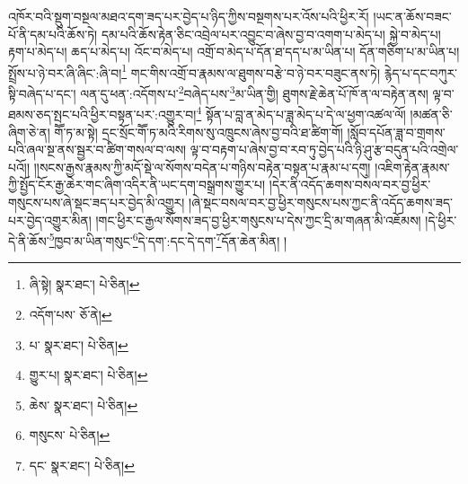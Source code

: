 འཁོར་བའི་སྡུག་བསྔལ་མཐའ་དག་ཟད་པར་བྱེད་པ་ཉིད་ཀྱིས་བསྔགས་པར་འོས་པའི་ཕྱིར་རོ། །ཡང་ན་ཆོས་བཟང་པོ་ནི་དམ་པའི་ཆོས་ཏེ། དམ་པའི་ཆོས་རྟེན་ཅིང་འབྲེལ་པར་འབྱུང་བ་ཞེས་བྱ་བ་འགག་པ་མེད་པ། སྐྱེ་བ་མེད་པ། རྟག་པ་མེད་པ། ཆད་པ་མེད་པ། འོང་བ་མེད་པ། འགྲོ་བ་མེད་པ་དོན་ཐ་དད་པ་མ་ཡིན་པ། དོན་གཅིག་པ་མ་ཡིན་པ། སྤྲོས་པ་ཉེ་བར་ཞི་ཞིང་:ཞི་བ།\footnote{ཞི་སྟེ།  སྣར་ཐང་།  པེ་ཅིན། } གང་གིས་འགྲོ་བ་རྣམས་ལ་ཐུགས་བརྩེ་བ་ཉེ་བར་བཟུང་ནས་ཏེ། རྙེད་པ་དང་བཀུར་སྟི་བཞེད་པ་དང་། ལན་དུ་ཕན་:འདོགས་པ་\footnote{འདོག་པས་  ཅོ་ནེ། }བཞེད་པས་\footnote{པ་  སྣར་ཐང་།  པེ་ཅིན། }མ་ཡིན་གྱི། ཐུགས་རྗེ་ཆེན་པོ་ཁོ་ན་ལ་བརྟེན་ནས། ལྟ་བ་ཐམས་ཅད་སྤང་པའི་ཕྱིར་བསྟན་པར་:འགྱུར་བ།\footnote{གྱུར་པ།  སྣར་ཐང་།  པེ་ཅིན། } སྟོན་པ་བླ་ན་མེད་པ་ཟླ་མེད་པ་དེ་ལ་ཕྱག་འཚལ་ལོ། །མཚན་ཅི་ཞིག་ཅེ་ན། གཽ་ཏ་མ་སྟེ། དྲང་སྲོང་གཽ་ཏ་མའི་རིགས་སུ་འཁྲུངས་ཞེས་བྱ་བའི་ཐ་ཚིག་གོ། །སློབ་དཔོན་ཟླ་བ་གྲགས་པའི་ཞལ་སྔ་ནས་སྦྱར་བ་ཚིག་གསལ་བ་ལས། ལྟ་བ་བརྟག་པ་ཞེས་བྱ་བ་རབ་ཏུ་བྱེད་པའི་ཉི་ཤུ་རྩ་བདུན་པའི་འགྲེལ་པའོ།། །།སངས་རྒྱས་རྣམས་ཀྱི་མདོ་སྡེ་ལ་སོགས་བདེན་པ་གཉིས་བརྟེན་བསྟན་པ་རྣམ་པ་དགུ། །འཇིག་རྟེན་རྣམས་ཀྱི་སྤྱོད་ངོར་རྒྱ་ཆེར་གང་ཞིག་འདིར་ནི་ཡང་དག་བསྒྲགས་གྱུར་པ། །དེར་ནི་འདོད་ཆགས་བསལ་བར་བྱ་ཕྱིར་གསུངས་པས་ཞེ་སྡང་ཟད་པར་བྱེད་མི་འགྱུར། །ཞེ་སྡང་བསལ་བར་བྱ་ཕྱིར་གསུངས་པས་ཀྱང་ནི་འདོད་ཆགས་ཟད་པར་བྱེད་འགྱུར་མིན། །གང་ཕྱིར་ང་རྒྱལ་སོགས་ཟད་བྱ་ཕྱིར་གསུངས་པ་དེས་ཀྱང་དྲི་མ་གཞན་མི་འཇོམས། །དེ་ཕྱིར་དེ་ནི་ཆོས་\footnote{ཆེས་  སྣར་ཐང་།  པེ་ཅིན། }ཁྱབ་མ་ཡིན་གསུང་\footnote{གསུངས་  པེ་ཅིན། }དེ་དག་:དང་དེ་དག་\footnote{དང་  སྣར་ཐང་།  པེ་ཅིན། }དོན་ཆེན་མིན། །
